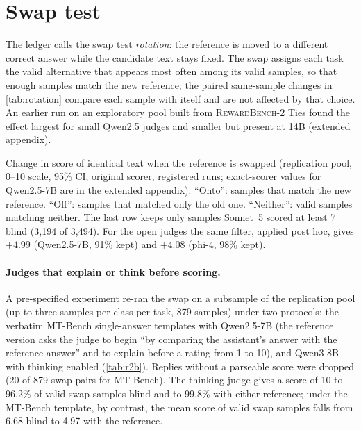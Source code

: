 \FloatBarrier
\section{Swap test}
\label{app:rotation}

The ledger calls the swap test \emph{rot\-ation}: the reference is moved to a different correct answer while the candidate text stays fixed. The swap assigns each task the valid alternative that appears most often among its valid samples, so that enough samples match the new reference; the paired same-sample changes in \cref{tab:rotation} compare each sample with itself and are not affected by that choice. An earlier run on an exploratory pool built from \textsc{RewardBench-2} Ties found the effect largest for small Qwen2.5 judges and smaller but present at 14B (extended appendix).

\begin{table}[htbp]
\centering
\caption{Change in score of identical text when the reference is swapped (replication pool, 0--10 scale, 95\% CI; original scorer, registered runs; exact-scorer values for Qwen2.5-7B are in the extended appendix). ``Onto'': samples that match the new reference. ``Off'': samples that matched only the old one. ``Neither'': valid samples matching neither. The last row keeps only samples Sonnet~5 scored at least 7 blind (3,194 of 3,494). For the open judges the same filter, applied post hoc, gives $+4.99$  (Qwen2.5-7B, 91\% kept) and $+4.08$ (phi-4, 98\% kept).\pre}
\label{tab:rotation}
\footnotesize
\setlength{\tabcolsep}{3pt}
\begin{adjustbox}{max width=\linewidth}\end{adjustbox}
\end{table}

\paragraph{Judges that explain or think before scoring.}
A pre-specified experiment re-ran the swap on a subsample of the replication pool (up to three samples per class per task, 879 samples) under two protocols: the verbatim MT-Bench single-answer templates with Qwen2.5-7B (the reference version asks the judge to begin ``by comparing the assistant's answer with the reference answer'' and to explain before a rating from 1 to 10), and Qwen3-8B with thinking enabled (\cref{tab:r2b}). Replies without a parseable score were dropped (20 of 879 swap pairs for MT-Bench). The thinking judge gives a score of 10 to 96.2\% of valid swap samples blind and to 99.8\% with either reference; under the MT-Bench template, by contrast, the mean score of valid swap samples falls from 6.68 blind to 4.97 with the reference.\ph

